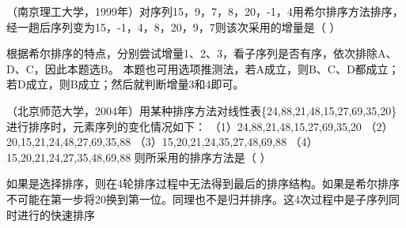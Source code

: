\question （南京理工大学，1999年）对序列15，9，7，8，20，-1，4用希尔排序方法排序，经一趟后序列变为15，-1，4，8，20，9，7则该次采用的增量是（
）
\par{}
\begin{solution}根据希尔排序的特点，分别尝试增量1、2、3，看子序列是否有序，依次排除A、D、C，因此本题选B。
本题也可用选项推测法，若A成立，则B、C、D都成立；若D成立，则B成立；然后就判断增量3和4即可。
\end{solution}
\question （北京师范大学，2004年）用某种排序方法对线性表\{24,88,21,48,15,27,69,35,20\}进行排序时，元素序列的变化情况如下：
（1）24,88,21,48,15,27,69,35,20 （2）20,15,21,24,48,27,69,35,88
（3）15,20,21,24,35,27,48,69,88 （4）15,20,21,24,27,35,48,69,88
则所采用的排序方法是（ ）
\par{}
\begin{solution}如果是选择排序，则在4轮排序过程中无法得到最后的排序结构。如果是希尔排序不可能在第一步将20换到第一位。同理也不是归并排序。这4次过程中是子序列同时进行的快速排序
\end{solution}
